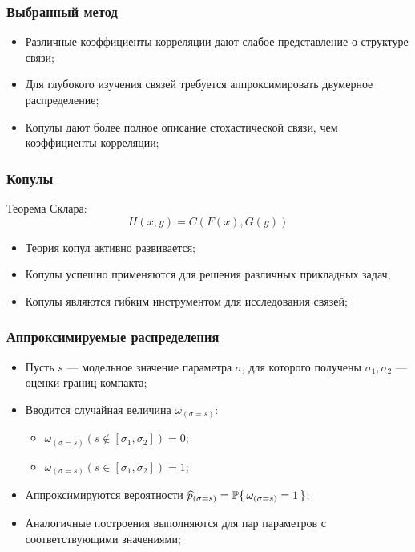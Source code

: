 \documentclass[11pt]{beamer}
\begin{document}
\begin{frame}
\frametitle{Выбранный метод}
\begin{itemize}
  \item Различные коэффициенты корреляции дают слабое представление о структуре связи;
  \item Для глубокого изучения связей требуется аппроксимировать двумерное распределение;
  \item Копулы дают более полное описание стохастической связи, чем коэффициенты корреляции;
\end{itemize}
\end{frame}

\begin{frame}
\begin{center}
\frametitle{Копулы}
Теорема Склара:
\begin{equation}
H(x, y) = C(F(x), G(y))
\end{equation}
\begin{itemize}
  \item Теория копул активно развивается;
  \item Копулы успешно применяются для решения различных прикладных задач;
  \item Копулы являются гибким инструментом для исследования связей;
\end{itemize}
\end{center}
\end{frame}

\begin{frame}
\begin{center}
\frametitle{Аппроксимируемые распределения}
\begin{itemize}
  \item Пусть $s$ --- модельное значение параметра $\sigma$, для которого получены $\sigma_1, \sigma_2$ --- оценки границ компакта;
  \item Вводится случайная величина $\omega_{(\sigma = s)}$:
  \begin{itemize}
    \item $\omega_{(\sigma = s)}(s \notin [\sigma_1, \sigma_2]) = 0$;
    \item $\omega_{(\sigma = s)}(s \in [\sigma_1, \sigma_2]) = 1$;
  \end{itemize}
  \item Аппроксимируются вероятности $\widehat{p}_{(\sigma = s)} = \P\{\, \omega_{(\sigma = s)} = 1\,\}$;
  \item Аналогичные построения выполняются для пар параметров с соответствующими значениями;
\end{itemize}
\end{center}
\end{frame}
\end{document}
